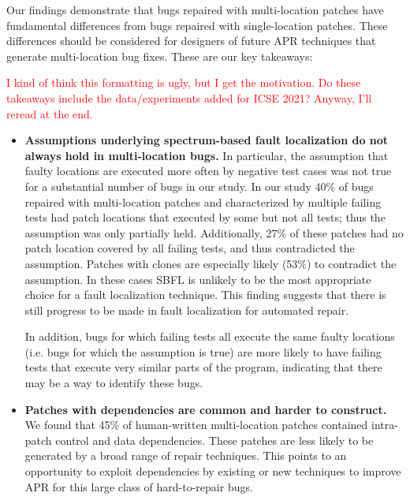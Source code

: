 \documentclass[10pt, conference]{IEEEtran}
\newcommand\todo[1]{\textcolor{red}{#1}}
\begin{document}
Our findings demonstrate that bugs repaired with multi-location patches have
fundamental differences from bugs repaired with single-location patches. These
differences should be considered for designers of future APR techniques that
generate multi-location bug fixes. These are our key takeaways:

\todo{I kind of think this formatting is ugly, but I get the motivation.  Do
  these takeaways include the data/experiments added for ICSE 2021?  Anyway,
  I'll reread at the end.}
\begin{itemize}[wide, labelindent=0pt]
\item \textbf{Assumptions underlying spectrum-based fault
  localization do not always hold in multi-location bugs.}
In particular, the assumption that faulty locations
are executed more often by negative test cases was not true for a substantial
number of bugs in our study. In our study 40\% of bugs repaired with
multi-location patches and characterized by multiple failing tests had patch
locations that executed by some but not all tests; thus the assumption was only 
partially held. Additionally, 27\% of
these patches had no patch location covered by all failing
tests, and thus contradicted the assumption.  
Patches with clones are especially likely (53\%) to contradict the assumption.
In these cases SBFL is unlikely to be the most 
appropriate choice for a
fault localization technique. This finding suggests that there is still progress
to be made in fault localization for automated repair.

In addition, bugs for which failing tests all execute the same faulty locations (i.e. bugs for 
which the assumption is true) are more likely to have failing tests that execute very similar 
parts of the program, indicating that there may be a way to identify these bugs.

\item \textbf{Patches with dependencies are common and harder to construct.}
We found that 45\% of human-written multi-location patches contained
intra-patch control and data dependencies. These patches are less likely to be
generated by a broad range of repair techniques. 
This points to an opportunity to exploit dependencies by
existing or new techniques to improve APR for this large class of hard-to-repair
bugs.


\end{itemize}
\end{document}
